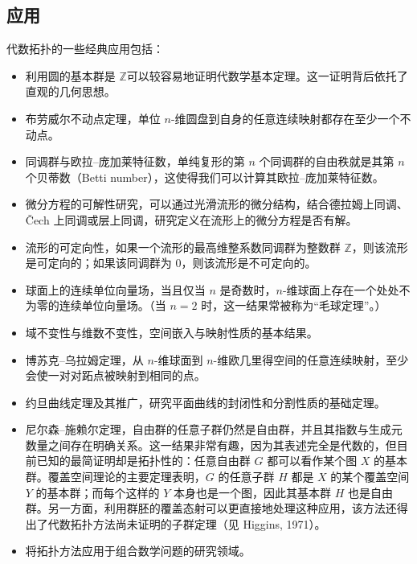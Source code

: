 \subsection{应用}
代数拓扑的一些经典应用包括：
\begin{itemize}
\item 利用圆的基本群是 $\mathbb{Z}$可以较容易地证明代数学基本定理。这一证明背后依托了直观的几何思想。
\item 布劳威尔不动点定理，单位 $n$-维圆盘到自身的任意连续映射都存在至少一个不动点。
\item 同调群与欧拉–庞加莱特征数，单纯复形的第 $n$ 个同调群的自由秩就是其第 $n$ 个贝蒂数（Betti number），这使得我们可以计算其欧拉–庞加莱特征数。
\item 微分方程的可解性研究，可以通过光滑流形的微分结构，结合德拉姆上同调、Čech 上同调或层上同调，研究定义在流形上的微分方程是否有解。
\item 流形的可定向性，如果一个流形的最高维整系数同调群为整数群 $\mathbb{Z}$，则该流形是可定向的；如果该同调群为 $0$，则该流形是不可定向的。
\item 球面上的连续单位向量场，当且仅当 $n$ 是奇数时，$n$-维球面上存在一个处处不为零的连续单位向量场。（当 $n=2$ 时，这一结果常被称为“毛球定理”。）
\item 域不变性与维数不变性，空间嵌入与映射性质的基本结果。
\item 博苏克–乌拉姆定理，从 $n$-维球面到 $n$-维欧几里得空间的任意连续映射，至少会使一对对跖点被映射到相同的点。
\item 约旦曲线定理及其推广，研究平面曲线的封闭性和分割性质的基础定理。
\item 尼尔森–施赖尔定理，自由群的任意子群仍然是自由群，并且其指数与生成元数量之间存在明确关系。这一结果非常有趣，因为其表述完全是代数的，但目前已知的最简证明却是拓扑性的：任意自由群 $G$ 都可以看作某个图 $X$ 的基本群。覆盖空间理论的主要定理表明，$G$ 的任意子群 $H$ 都是 $X$ 的某个覆盖空间 $Y$ 的基本群；而每个这样的 $Y$ 本身也是一个图，因此其基本群 $H$ 也是自由群。另一方面，利用群胚的覆盖态射可以更直接地处理这种应用，该方法还得出了代数拓扑方法尚未证明的子群定理（见 Higgins, 1971）。
\item 将拓扑方法应用于组合数学问题的研究领域。
\end{itemize}
